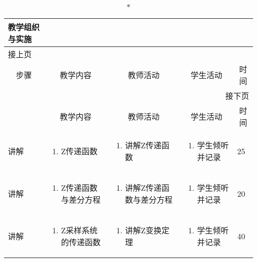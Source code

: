 {%
\begin{landscape}

\begin{longtable}{|m{10mm}|m{50mm}|m{50mm}|m{50mm}|m{15mm}|}
\caption*{\huge 教学组织与实施}\\
\hline
\endfirsthead
\multicolumn{5}{l}{\small 接上页}\\
\hline
\multicolumn{1}{|c|}{步骤}&\multicolumn{1}{c|}{教学内容}&\multicolumn{1}{c|}{教师活动}&\multicolumn{1}{c|}{学生活动}&\multicolumn{1}{c|}{时间}\\
\hline
\endhead

\multicolumn{5}{r}{\small 接下页}\\
\endfoot
\hline
\endlastfoot
\multicolumn{1}{|c|}{步骤}&\multicolumn{1}{c|}{教学内容}&\multicolumn{1}{c|}{教师活动}&\multicolumn{1}{c|}{学生活动}&\multicolumn{1}{c|}{时间}\\\hline
讲解&\begin{enumerate}
\item Z传递函数
\end{enumerate} &\begin{enumerate}
\item 讲解Z传递函数
\end{enumerate} &\begin{enumerate}
\item 学生倾听并记录
\end{enumerate} &25\\\hline
讲解&\begin{enumerate}
\item Z传递函数与差分方程
\end{enumerate}
 &\begin{enumerate}
\item 讲解Z传递函数与差分方程
\end{enumerate} &\begin{enumerate}
\item 学生倾听并记录
\end{enumerate} &20 \\\hline
讲解&\begin{enumerate}
\item Z采样系统的传递函数
\end{enumerate}
&\begin{enumerate}
\item 讲解Z变换定理
\end{enumerate} &\begin{enumerate}
\item 学生倾听并记录
\end{enumerate} &40 \\\hline


\end{longtable}
\end{landscape}}
